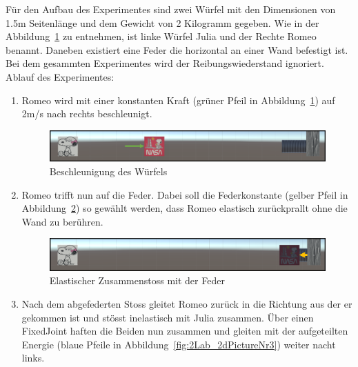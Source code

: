 \documentclass[../main.tex]{subfiles}
\begin{document}
    Für den Aufbau des Experimentes sind zwei Würfel mit den Dimensionen von 1.5m Seitenlänge und dem Gewicht von 2
    Kilogramm gegeben.
    Wie in der Abbildung~\ref{fig:2Lab_2dPictureNr1} zu entnehmen, ist linke Würfel Julia und der Rechte Romeo benannt.
    Daneben existiert eine Feder die horizontal an einer Wand befestigt ist.
    Bei dem gesammten Experimentes wird der Reibungswiederstand ignoriert.
    Ablauf des Experimentes:
 \begin{enumerate}
     \item Romeo wird mit einer konstanten Kraft (grüner Pfeil in Abbildung~\ref{fig:2Lab_2dPictureNr1}) auf
     2m/s nach rechts beschleunigt.
     \begin{figure}[h]
                 \begin{center}
                     \centerline{\includegraphics[width=155mm]{./images/2Lab_2dPictureNr1.png}}
                     \caption{Beschleunigung des Würfels}
                     \label{fig:2Lab_2dPictureNr1}
                 \end{center}
     \end{figure}
     \item Romeo trifft nun auf die Feder. Dabei soll die Federkonstante (gelber Pfeil in Abbildung~\ref{fig:2Lab_2dPictureNr2})
     so gewählt werden, dass Romeo elastisch zurückprallt ohne die Wand zu berühren.
     \begin{figure}[h]
               \begin{center}
                   \centerline{\includegraphics[width=155mm]{./images/2Lab_2dPictureNr2.png}}
                   \caption{Elastischer Zusammenstoss mit der Feder}
                   \label{fig:2Lab_2dPictureNr2}
               \end{center}
     \end{figure}
     \item Nach dem abgefederten Stoss gleitet Romeo zurück in die Richtung aus der er gekommen ist und stösst inelastisch mit Julia zusammen.
     Über einen FixedJoint haften die Beiden nun zusammen und gleiten mit der aufgeteilten Energie
     (blaue Pfeile in Abbildung~\ref{fig:2Lab_2dPictureNr3}) weiter nacht links.

\end{enumerate}
\end{document}
